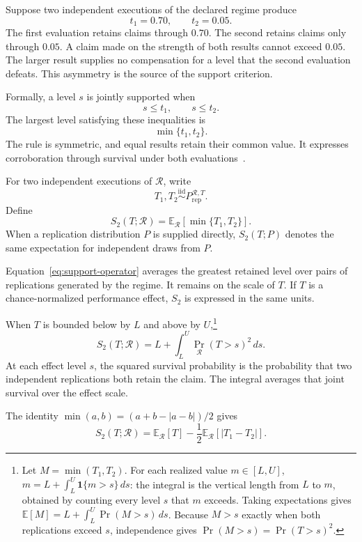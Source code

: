 \documentclass[11pt]{article}
\newcommand{\Regime}{\mathcal{R}}
\newcommand{\E}{\mathbb{E}}
\newcommand{\iid}{\mathrel{\overset{\mathrm{iid}}{\sim}}}
\theoremstyle{remark}
\begin{document}
Suppose two independent executions of the declared regime produce
\[
t_1=0.70,
\qquad
t_2=0.05.
\]
The first evaluation retains claims through $0.70$. The second retains claims only through $0.05$. A claim made on the strength of both results cannot exceed $0.05$. The larger result supplies no compensation for a level that the second evaluation defeats. This asymmetry is the source of the support criterion.

Formally, a level $s$ is jointly supported when
\[
s\leq t_1,
\qquad
s\leq t_2.
\]
The largest level satisfying these inequalities is
\[
\min\{t_1,t_2\}.
\]
The rule is symmetric, and equal results retain their common value. It expresses corroboration through survival under both evaluations~\cite{popper1959logic}.

For two independent executions of $\Regime$, write
\[
T_1,T_2
\iid
P_{\mathrm{rep}}^{\Regime,T}.
\]
Define
\begin{equation}
S_2(T;\Regime)
=
\E_{\Regime}[\min\{T_1,T_2\}].
\label{eq:support-operator}
\end{equation}
When a replication distribution $P$ is supplied directly, $S_2(T;P)$ denotes the same expectation for independent draws from $P$.

Equation~\eqref{eq:support-operator} averages the greatest retained level over pairs of replications generated by the regime. It remains on the scale of $T$. If $T$ is a chance-normalized performance effect, $S_2$ is expressed in the same units.

When $T$ is bounded below by $L$ and above by $U$,\footnote{Let $M=\min(T_1,T_2)$. For each realized value $m\in[L,U]$, $m=L+\int_L^U\mathbf{1}\{m>s\}\,ds$: the integral is the vertical length from $L$ to $m$, obtained by counting every level $s$ that $m$ exceeds. Taking expectations gives $\E[M]=L+\int_L^U\Pr(M>s)\,ds$. Because $M>s$ exactly when both replications exceed $s$, independence gives $\Pr(M>s)=\Pr(T>s)^2$.}
\begin{equation}
S_2(T;\Regime)
=
L+\int_L^U \Pr_{\Regime}(T>s)^2\,ds .
\label{eq:joint-survival}
\end{equation}
At each effect level $s$, the squared survival probability is the probability that two independent replications both retain the claim. The integral averages that joint survival over the effect scale.

The identity $\min(a,b)=(a+b-|a-b|)/2$ gives
\begin{equation}
S_2(T;\Regime)
=
\E_{\Regime}[T]
-
\frac12\E_{\Regime}[|T_1-T_2|].
\label{eq:general-decomposition}
\end{equation}
\end{document}
